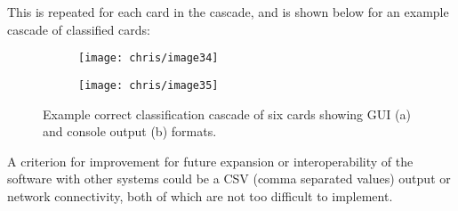 		This is repeated for each card in the cascade, and is shown below for an example cascade of classified cards:

		\begin{figure}[H]
			\centering
			\begin{subfigure}[b]{\textwidth}
				\centering
				\texttt{[image: chris/image34]}
				\caption{}
			\end{subfigure}
		\end{figure}
		\begin{figure}[H]
			\ContinuedFloat
			\centering
			\begin{subfigure}[b]{\textwidth}
				\centering
				\texttt{[image: chris/image35]}
				\caption{}
			\end{subfigure}
			\caption{Example correct classification cascade of six cards showing GUI (a) and console output (b) formats.}
		\end{figure}

		A criterion for improvement for future expansion or interoperability of the software with other systems could be a CSV (comma separated values) output or network connectivity, both of which are not too difficult to implement.